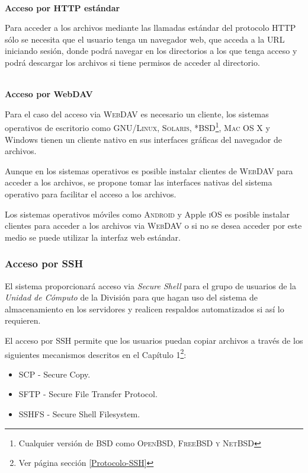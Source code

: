           \textbf{\\ Acceso por HTTP est\'{a}ndar \\}

Para acceder a los archivos mediante las llamadas est\'{a}ndar del protocolo HTTP s\'{o}lo se necesita que el usuario tenga un navegador web, que acceda a la \textsc{URL} iniciando sesi\'{o}n, donde podr\'{a} navegar en los directorios a los que tenga acceso y podr\'{a} descargar los archivos si tiene permisos de acceder al directorio.

          \textbf{\\ Acceso por WebDAV \\}

Para el caso del acceso via \textsc{WebDAV} es necesario un cliente, los sistemas operativos de escritorio como \textsc{GNU/Linux}, \textsc{Solaris}, \textsc{*BSD\footnote{Cualquier versi\'{o}n de BSD como \textsc{OpenBSD, FreeBSD y NetBSD}}}, \textsc{Mac OS X} y Windows tienen un cliente nativo en sus interfaces gr\'{a}ficas del navegador de archivos.

Aunque en los sistemas operativos es posible instalar clientes de \textsc{WebDAV} para acceder a los archivos, se propone tomar las interfaces nativas del sistema operativo para facilitar el acceso a los archivos.

Los sistemas operativos m\'{o}viles como \textsc{Android} y Apple \textsc{iOS} es posible instalar clientes para acceder a los archivos via \textsc{WebDAV} o si no se desea acceder por este medio se puede utilizar la interfaz web est\'{a}ndar.

        \subsubsection {Acceso por SSH}

El sistema proporcionar\'{a} acceso via \textit{Secure Shell} para el grupo de usuarios de la \textit{Unidad de C\'{o}mputo} de la Divisi\'{o}n para que hagan uso del sistema de almacenamiento en los servidores y realicen respaldos automatizados si as\'{i} lo requieren.

El acceso por \textsc{SSH} permite que los usuarios puedan copiar archivos a trav\'{e}s de los siguientes mecanismos descritos en el Cap\'{i}tulo 1\footnote{Ver p\'{a}gina \pageref{Protocolo-SSH} secci\'{o}n \ref{Protocolo-SSH}}:

\begin{itemize}
  \item{\textsc{SCP} - Secure Copy}.
  \item{\textsc{SFTP} - Secure File Transfer Protocol}.
  \item{\textsc{SSHFS} - Secure Shell Filesystem}.
\end{itemize}

